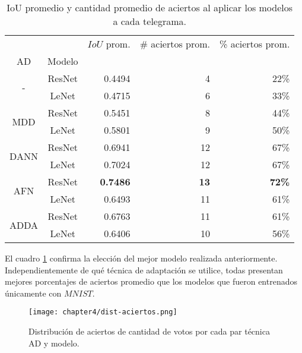 \begin{table}[H]
    \centering
    \begin{tabular}{cc|rrr}
        \toprule
                                 &        & $IoU$ prom.     & \# aciertos prom. & \% aciertos prom. \\
        AD                       & Modelo &                 &                   &                   \\
        \midrule
        \multirow[c]{2}{*}{-}    & ResNet & 0.4494          & 4                 & 22\%              \\
                                 & LeNet  & 0.4715          & 6                 & 33\%              \\\hline
        \multirow[c]{2}{*}{MDD}  & ResNet & 0.5451          & 8                 & 44\%              \\
                                 & LeNet  & 0.5801          & 9                 & 50\%              \\\hline
        \multirow[c]{2}{*}{DANN} & ResNet & 0.6941          & 12                & 67\%              \\
                                 & LeNet  & 0.7024          & 12                & 67\%              \\\hline
        \multirow[c]{2}{*}{AFN}  & ResNet & \textbf{0.7486} & \textbf{13}       & \textbf{72\%}     \\
                                 & LeNet  & 0.6493          & 11                & 61\%              \\\hline
        \multirow[c]{2}{*}{ADDA} & ResNet & 0.6763          & 11                & 61\%              \\
                                 & LeNet  & 0.6406          & 10                & 56\%              \\
        \bottomrule
    \end{tabular}
    \caption{IoU promedio y cantidad promedio de aciertos al aplicar los modelos a cada telegrama.}
    \label{tab:iou-cant-aciertos-en-telegramas}
\end{table}

El cuadro \ref{tab:iou-cant-aciertos-en-telegramas} confirma la elecci\'on del mejor modelo realizada anteriormente.
Independientemente de qu\'e t\'ecnica de adaptaci\'on se utilice, todas presentan mejores porcentajes de aciertos
promedio que los modelos que fueron entrenados \'unicamente con $MNIST$.

\begin{figure}[H]
    \centering
    \texttt{[image: chapter4/dist-aciertos.png]}
    \caption{Distribuci\'on de aciertos de cantidad de votos por cada par t\'ecnica AD y modelo.}
    \label{fig:distribucion-aciertos}
\end{figure}


